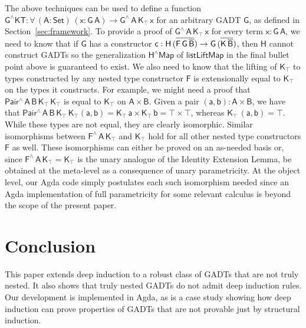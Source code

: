 \documentclass[9pt]{entcs}
\begin{document}
The above techniques can be used to define a function
$\mathsf{G^\wedge KT : \forall\, (A : Set)\, (x : G\,A) \to
  G^{\wedge}\, A\, K_\top\, x}$ for an arbitrary GADT $\mathsf{G}$, as
defined in Section~\ref{sec:framework}.  To provide a proof of
$\mathsf{G^{\wedge}\, A\, K_\top \, x}$ for every term $\mathsf{x :
  G\, A}$, we need to know that if $\mathsf{G}$ has a constructor
$\mathsf{c : H \, (\overline{F\,G\, \overline{B}}) \to G\, (\overline{K\,\overline{B}})}$,
then $\mathsf{H}$ cannot construct GADTs so the generalization
$\mathsf{H^\wedge Map}$ of $\mathsf{listLiftMap}$ in the final bullet
point above is guaranteed to exist. We also need to know that the
lifting of $\mathsf{K_\top}$ to types constructed by any nested type
constructor $\mathsf{F}$ is extensionally equal to $\mathsf{K_\top}$
on the types it constructs. For example, we might need a proof that
$\mathsf{Pair^{\wedge}\,A\,B\,K_\top\,K_\top}$ is equal to
$\mathsf{K_\top}$ on $\mathsf{A \times B}$.  Given a pair $\mathsf{(a
  , b) : A \times B}$, we have that
$\mathsf{Pair^{\wedge}\,A\,B\,K_\top\,K_\top (a, b) = K_\top \, a
  \times K_\top\, b = \top \times \top}$, whereas $\mathsf{K_\top\,
  (a, b) = \top}$. While these types are not equal, they are clearly
isomorphic. Similar isomorphisms between
$\mathsf{F^{\wedge}\,A\,K_\top}$ and $\mathsf{K_\top}$ hold for all
other nested type constructors $\mathsf{F}$ as well. These
isomorphisms can either be proved on an as-needed basis or, since
$\mathsf{F^\wedge\,A\,K_\top = K_\top}$ is the unary analogue of the
Identity Extension Lemma, be obtained at the meta-level as a
consequence of unary parametricity. At the object level, our Agda code
simply postulates each such isomorphism needed since an Agda
implementation of full parametricity for some relevant calculus is
beyond the scope of the present paper.

\section{Conclusion}\label{sec:conclusion}

This paper extends deep induction to a robust class of GADTs that are
not truly nested. It also shows that truly nested GADTs do not admit
deep induction rules. Our development is implemented in Agda, as is a
case study showing how deep induction can prove properties of GADTs
that are not provable just by structural induction.
\end{document}
